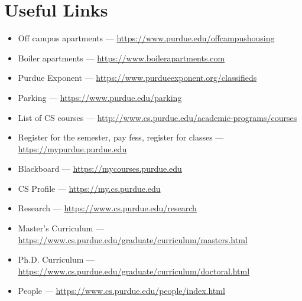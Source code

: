 \section{Useful Links}

\begin{itemize}

	\item Off campus apartments --- \url{https://www.purdue.edu/offcampushousing}

	\item Boiler apartments --- \url{https://www.boilerapartments.com}

	\item Purdue Exponent --- \url{https://www.purdueexponent.org/classifieds}

	\item Parking --- \url{https://www.purdue.edu/parking}

	\item List of CS courses --- \url{http://www.cs.purdue.edu/academic-programs/courses}

	\item Register for the semester, pay fess, register for classes --- \url{https://mypurdue.purdue.edu}

	\item Blackboard --- \url{https://mycourses.purdue.edu}

	\item CS Profile --- \url{https://my.cs.purdue.edu}

	\item Research --- \url{https://www.cs.purdue.edu/research}

	\item Master's Curriculum --- \url{https://www.cs.purdue.edu/graduate/curriculum/masters.html}

	\item Ph.D. Curriculum --- \url{https://www.cs.purdue.edu/graduate/curriculum/doctoral.html}

	\item People --- \url{https://www.cs.purdue.edu/people/index.html}


\end{itemize}